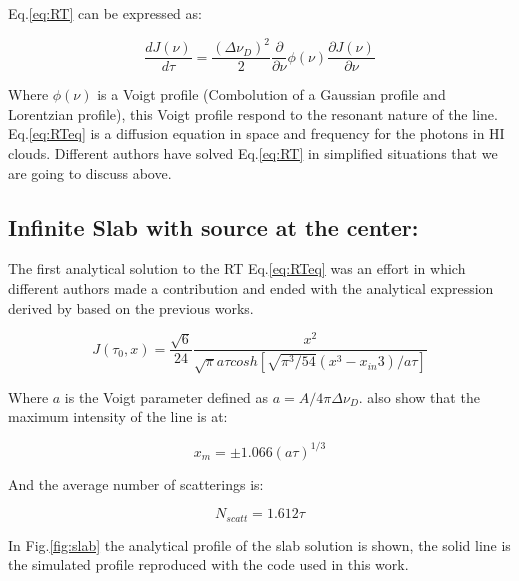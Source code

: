 Eq.\ref{eq:RT} can be expressed as: 

\begin{equation}\label{eq:RTeq}
\dfrac{dJ(\nu)}{d\tau} = \dfrac{(\Delta \nu_D)^2}{2}\dfrac{\partial}{\partial \nu}\phi(\nu)\dfrac{\partial J(\nu)}{\partial \nu}
\end{equation}

Where $\phi(\nu)$ is a Voigt profile (Combolution of a Gaussian profile  
and Lorentzian profile), this Voigt profile respond to the resonant nature 
of the line. Eq.\ref{eq:RTeq} is a diffusion equation in space and frequency
for the \ly photons in HI clouds. Different authors have solved 
Eq.\ref{eq:RT} in simplified situations that we are going to discuss above. 

\subsection{Infinite Slab with \ly source at the center:}

The first analytical solution to the RT Eq.\ref{eq:RTeq}
was an effort in which different authors made a contribution \citep{Unno55, Osterbrock62, Adams72, Harrington73} and ended with the analytical expression
derived by \citep{Neufeld90} based on the previous works. 

\begin{equation}
J(\tau_0, x) = \dfrac{\sqrt{6}}{24}\dfrac{x^2}{\sqrt{\pi}a\tau cosh[\sqrt{\pi^3/54}(x^3-x_{in}3)/a\tau]}
\end{equation}

Where $a$ is the Voigt parameter defined as $a=A/4\pi\Delta \nu_D$. \citep{Harrington73} also show that the maximum intensity of the line is at:

\begin{equation}
x_m = \pm1.066(a\tau)^{1/3}
\end{equation}

And the average number of scatterings is:

\begin{equation}
N_{scatt} = 1.612\tau
\end{equation}

In Fig.\ref{fig:slab} the analytical profile of the slab solution is shown, 
the solid line is the simulated profile reproduced with \citep{CLARA} the code
used in this work.

